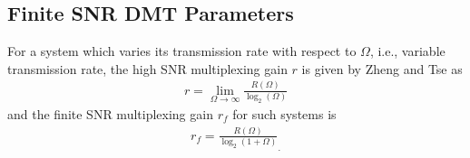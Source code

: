 \subsection{Finite SNR DMT Parameters}
For a system which varies its transmission rate with respect to $\Omega$, i.e., variable transmission rate, the high SNR multiplexing gain $r$ is given by Zheng and Tse \cite{zheng2003diversity} as
\begin{eqnarray} \label{interference_management_HBD_ACS_asymp_mult_gain}
r = \lim_{\Omega\to\infty} \frac{R(\Omega)}{\log_2(\Omega)}
\end{eqnarray}
and the finite SNR multiplexing gain $r_f$ for such systems is \cite[Eq. (4)]{narasimhan2006finite}
\begin{eqnarray} \label{interference_management_HBD_ACS_rf}
r_f = \frac{R(\Omega)}{\log_2(1+\Omega)}_.
\end{eqnarray}

